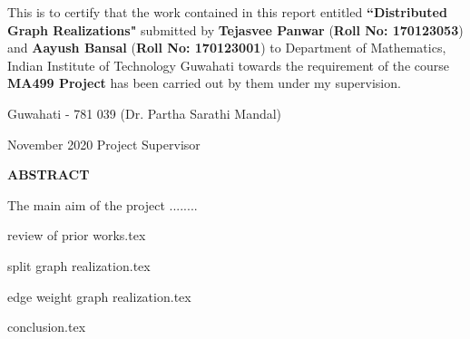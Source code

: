 \documentclass[12pt]{report}
\theoremstyle{plain}
\theoremstyle{definition}
\theoremstyle{remark}
\begin{document}
\noindent
This is to certify that the work contained in this report
entitled {\textbf{``Distributed Graph Realizations"}} submitted by \textbf{Tejasvee Panwar}
(\textbf{Roll No: 170123053}) and \textbf{Aayush Bansal}
(\textbf{Roll No: 170123001}) to Department of Mathematics, Indian Institute of Technology
Guwahati towards the requirement of the course \textbf{MA499 Project}
has been carried out by them under my
supervision.

\vspace{4cm}

\noindent Guwahati - 781 039 \hfill (Dr. Partha Sarathi Mandal)

\noindent November 2020   \hfill Project Supervisor

\clearpage

\begin{center}
{\Large{\bf{ABSTRACT}}}
\end{center}


The main aim of the project ........

\clearpage



\tableofcontents
\clearpage
\listoffigures


\newpage

\setcounter{page}{1}




 {review of prior works.tex}

 {split graph realization.tex}

 {edge weight graph realization.tex}

 {conclusion.tex}

\nocite{golub} \nocite{gerla}\nocite{m1}\nocite{chang}



\end{document}
